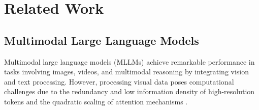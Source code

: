 \vspace{-1mm}
\section{Related Work}
\vspace{-1mm}
\subsection{Multimodal Large Language Models}
Multimodal large language models (MLLMs) \citep{liu2024improved, li2023blip, zhu2023minigpt, liu2024visual} achieve remarkable performance in tasks involving images, videos, and multimodal reasoning by integrating vision and text processing. 
However, processing visual data poses computational challenges due to the redundancy and low information density of high-resolution tokens \citep{liang2022evit} and the quadratic scaling of attention mechanisms \citep{vaswani2017attention}. 
